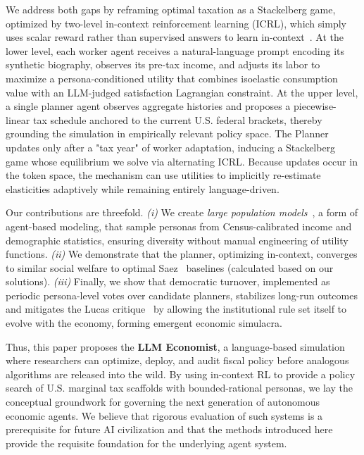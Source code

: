 We address both gaps by reframing optimal taxation as a Stackelberg game, optimized by two-level in-context reinforcement learning (ICRL), which simply uses scalar reward rather than supervised answers to learn in-context~\citep{monea2024llms,moeini2025survey,laskin2022context}. 
At the lower level, each worker agent receives a natural-language prompt encoding its synthetic biography, observes its pre-tax income, and adjusts its labor to maximize a persona-conditioned utility that combines isoelastic consumption value with an LLM-judged satisfaction Lagrangian constraint.  
At the upper level, a single planner agent observes aggregate histories and proposes a piecewise-linear tax schedule anchored to the current U.S. federal brackets, thereby grounding the simulation in empirically relevant policy space. The Planner updates only after a "tax year" of worker adaptation, inducing a Stackelberg game whose equilibrium we solve via alternating ICRL. Because updates occur in the token space, the mechanism can use utilities to implicitly re-estimate elasticities adaptively while remaining entirely language-driven.

Our contributions are threefold. \textit{(i)} We create \textit{large population models}~\citep{lpm2024technical}, a form of agent-based modeling, that sample personas from Census-calibrated income and demographic statistics, ensuring diversity without manual engineering of utility functions. \textit{(ii)} We demonstrate that the planner, optimizing in-context, converges to similar social welfare to optimal Saez~\citep{saez2001using} baselines (calculated based on our solutions). \textit{(iii)} Finally, we show that democratic turnover, implemented as periodic persona-level votes over candidate planners, stabilizes long-run outcomes and mitigates the Lucas critique~\citep{lucas1976econometric} 
by allowing the institutional rule set itself to evolve with the economy, forming emergent economic simulacra.

Thus, this paper proposes the \textbf{LLM Economist}, a language-based simulation where researchers can optimize, deploy, and audit fiscal policy before analogous algorithms are released into the wild. By using in-context RL to provide a policy search of U.S. marginal tax scaffolds with bounded-rational personas, we lay the conceptual groundwork for governing the next generation of autonomous economic agents. We believe that rigorous evaluation of such systems is a prerequisite for future AI civilization and that the methods introduced here provide the requisite foundation for the underlying agent system.